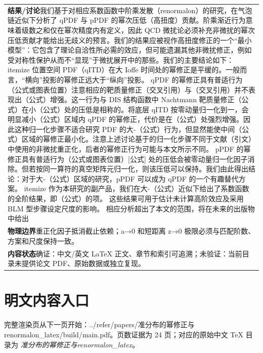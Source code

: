 \documentclass[UTF8,11pt,oneside]{ctexbook}
\begin{document}
\begin{table}[htbp]
\begin{tabular}{@{}p{}@{}}
    \textbf{结果/讨论}\quad 我们基于对相应系数函数中阶乘发散（renormalon）的研究，在气泡链近似下分析了 qPDF 与 pPDF 的幂次压低（高扭度）贡献。阶乘渐近行为意味着级数之和仅在幂次精度内有定义，因此 QCD 微扰论必须补充非微扰的幂次压低贡献才能给出无歧义的预言。我们的结果应被视作高扭度修正的一个``最小模型''：它包含了理论自洽性所必需的效应，但可能遗漏其他非微扰修正，例如受对称性保护从而不``显现''于微扰展开中的那些。我们的主要结论如下： itemize 位置空间 PDF（qITD）在大 Ioffe 时间处的幂修正是平缓的。一般而言，``横向''投影的幂修正远大于``纵向''投影。 qPDF 的幂修正具有普适行为（公式或图表位置）注意相应的靶质量修正（交叉引用）与（交叉引用）并不表现出（公式）增强。这一行为与 DIS 结构函数中 Nachtmann 靶质量修正（公式）在小（公式）处的压低是相称的。将底层 qITD 按零动量归一化到一，会明显减小（公式）区域内 qPDF 的幂修正，代价是在（公式）处强烈增强。因此这种归一化步骤不适合研究 PDF 的大-（公式）行为，但显然能使中间（公式）区域的幂修正最小化。注意上述讨论基于的归一化步骤不同于文献（引文）中使用的非微扰重正化，后者的幂修正行为可能与本文所示不同。 pPDF 的幂修正具有普适行为（公式或图表位置）[公式] 处的压低会被零动量归一化因子消除。但若按同一算符的真空矩阵元归一化，则该压低可以保持。我们由此得出结论：对于大-（公式）区域的研究，pPDF 可以成为 qPDF 的一个有趣替代方案。 itemize 作为本研究的副产品，我们在大-（公式）近似下给出了系数函数的全阶结果，即（公式）的项。 这些结果可用于估计未计算高阶效应及采用 BLM 型步骤设定尺度的影响。 相应分析超出了本文的范围，将在未来的出版物中给出 \\
    \textbf{物理边界}\quad 重正化因子抵消截止依赖；a→0 和短距离 z→0 极限必须与匹配阶数、方案和尺度保持一致。 \\
    \textbf{内容状态}\quad 确证：中文/英文 LaTeX 正文、章节和索引可追溯；未验证：当前目录未提供论文 PDF、原始数据或独立复现。 \\
    \bottomrule
  \end{tabular}
\end{table}
\section*{明文内容入口}
\noindent 完整渲染页从下一页开始：../\allowbreak{}refer/\allowbreak{}papers/\allowbreak{}准分布的幂修正与renormalon\_\allowbreak{}latex/\allowbreak{}build/\allowbreak{}main.pdf。页数证据为 24 页；对应的原始中文 TeX 目录为 \emph{准分布的幂修正与renormalon\_latex}。
\clearpage

\clearpage
\end{document}
